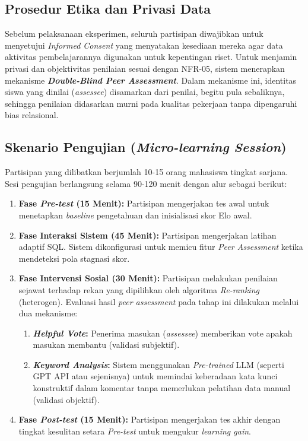 \subsection{Prosedur Etika dan Privasi Data}
Sebelum pelaksanaan eksperimen, seluruh partisipan diwajibkan
untuk menyetujui \textit{Informed Consent} yang menyatakan
kesediaan mereka agar data aktivitas pembelajarannya digunakan
untuk kepentingan riset. Untuk menjamin privasi dan objektivitas
penilaian sesuai dengan NFR-05, sistem menerapkan mekanisme
\textbf{\textit{Double-Blind Peer Assessment}}. Dalam mekanisme
ini, identitas siswa yang dinilai (\textit{assessee}) disamarkan
dari penilai, begitu pula sebaliknya, sehingga penilaian
didasarkan murni pada kualitas pekerjaan tanpa dipengaruhi
bias relasional.

\subsection{Skenario Pengujian (\textit{Micro-learning Session})}
Partisipan yang dilibatkan berjumlah 10-15 orang mahasiswa tingkat sarjana. Sesi pengujian berlangsung selama 90-120 menit dengan alur sebagai berikut:

\begin{enumerate}
    \item \textbf{Fase \textit{Pre-test} (15 Menit):} 
    Partisipan mengerjakan tes awal untuk menetapkan \textit{baseline} pengetahuan dan inisialisasi skor Elo awal.
    
    \item \textbf{Fase Interaksi Sistem (45 Menit):} 
    Partisipan mengerjakan latihan adaptif SQL. Sistem dikonfigurasi untuk memicu fitur \textit{Peer Assessment} ketika mendeteksi pola stagnasi skor.
    
    \item \textbf{Fase Intervensi Sosial (30 Menit):} 
    Partisipan melakukan penilaian sejawat terhadap rekan yang dipilihkan oleh algoritma \textit{Re-ranking} (heterogen). Evaluasi hasil \textit{peer assessment} pada tahap ini dilakukan melalui dua mekanisme:
    \begin{enumerate}
        \item \textbf{\textit{Helpful Vote}:} Penerima masukan (\textit{assessee}) memberikan vote apakah masukan membantu (validasi subjektif).
        \item \textbf{\textit{Keyword Analysis}:} Sistem menggunakan \textit{Pre-trained} LLM (seperti GPT API atau sejenisnya) untuk memindai keberadaan kata kunci konstruktif dalam komentar tanpa memerlukan pelatihan data manual (validasi objektif).
    \end{enumerate}
    
    \item \textbf{Fase \textit{Post-test} (15 Menit):} 
    Partisipan mengerjakan tes akhir dengan tingkat kesulitan setara \textit{Pre-test} untuk mengukur \textit{learning gain}.
\end{enumerate}

